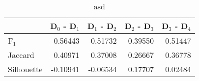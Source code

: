 \begin{table}
\centering
\caption{asd}
\label{tab:s1-cont-pivotbi-combined}
\begin{tabular}{lrrrr}
\toprule
{} &  D$_0$ - D$_1$ &  D$_1$ - D$_2$ &  D$_2$ - D$_3$ &  D$_3$ - D$_4$ \\
\midrule
F$_1$      &        0.56443 &        0.51732 &        0.39550 &        0.51447 \\
Jaccard    &        0.40971 &        0.37008 &        0.26667 &        0.36778 \\
Silhouette &       -0.10941 &       -0.06534 &        0.17707 &        0.02484 \\
\bottomrule
\end{tabular}
\end{table}

